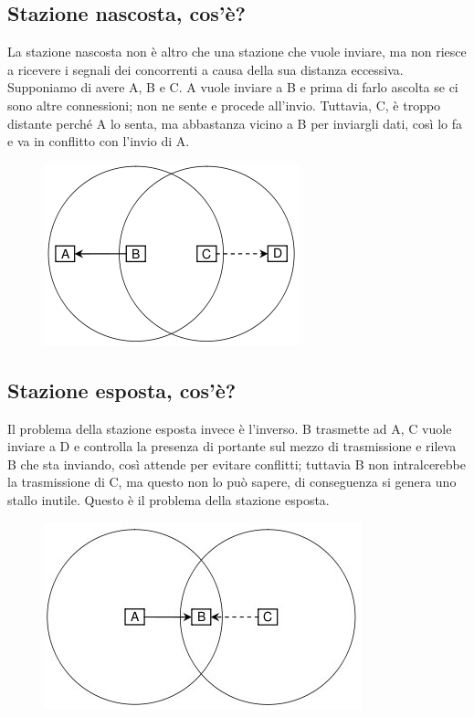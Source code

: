 \subsection{Stazione nascosta, cos'è?}
La stazione nascosta non è altro che una stazione che vuole inviare, ma non riesce a ricevere i segnali dei concorrenti a causa della sua distanza eccessiva. Supponiamo di avere A, B e C. A vuole inviare a B e prima di farlo ascolta se ci sono altre connessioni; non ne sente e procede all'invio. Tuttavia, C, è troppo distante perché A lo senta, ma abbastanza vicino a B per inviargli dati, così lo fa e va in conflitto con l'invio di A.

\begin{figure}[H]
\centering
\includegraphics[scale=0.6]{res/img/30_StazioneEsposta.png}
\end{figure} 

\subsection{Stazione esposta, cos'è?}

Il problema della stazione esposta invece è l'inverso. B trasmette ad A, C vuole inviare a D e controlla la presenza di portante sul mezzo di trasmissione e rileva B che sta inviando, così attende per evitare conflitti; tuttavia B non intralcerebbe la trasmissione di C, ma questo non lo può sapere, di conseguenza si genera uno stallo inutile. Questo è il problema della stazione esposta.
 
 \begin{figure}[H]
\centering
\includegraphics[scale=0.6]{res/img/30_StazioneNascosta.png}
\end{figure} 
